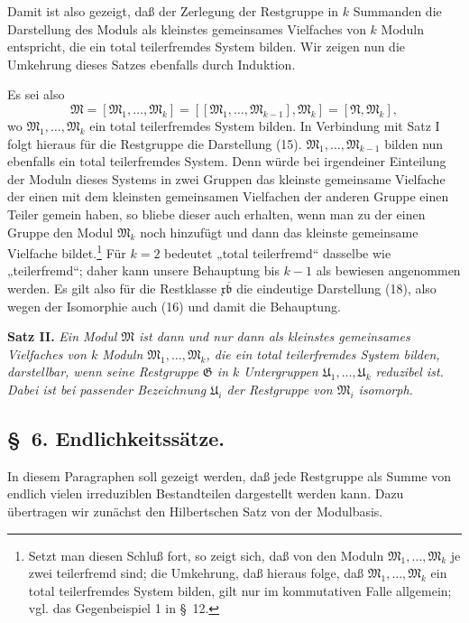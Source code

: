 \documentclass[11pt]{article}
\newcommand{\mM}{\mathfrak{M}}
\newcommand{\mN}{\mathfrak{N}}
\newcommand{\mG}{\mathfrak{G}}
\newcommand{\mb}{\mathfrak{b}}
\newcommand{\mx}{\mathfrak{x}}
\newcommand{\mU}{\mathfrak{U}}
\begin{document}
Damit ist also gezeigt, daß der Zerlegung der Restgruppe in $k$ Summanden die Darstellung des Moduls als kleinstes gemeinsames Vielfaches von $k$ Moduln entspricht, die ein total teilerfremdes System bilden. Wir zeigen nun die Umkehrung dieses Satzes ebenfalls durch Induktion.

Es sei also
\[
 \mM=[\mM_1,\ldots,\mM_k]=[[\mM_1,\ldots,\mM_{k-1}],\mM_k]=[\mN,\mM_k],
\]
wo $\mM_1,\ldots,\mM_k$ ein total teilerfremdes System bilden. In Verbindung mit Satz I folgt hieraus für die Restgruppe die Darstellung (15). $\mM_1,\ldots,\mM_{k-1}$ bilden nun ebenfalls ein total teilerfremdes System. Denn würde bei irgendeiner Einteilung der Moduln dieses Systems in zwei Gruppen das kleinste gemeinsame Vielfache der einen mit dem kleinsten gemeinsamen Vielfachen der anderen Gruppe einen Teiler gemein haben, so bliebe dieser auch erhalten, wenn man zu der einen Gruppe den Modul $\mM_k$ noch hinzufügt und dann das kleinste gemeinsame Vielfache bildet.\footnote{Setzt man diesen Schluß fort, so zeigt sich, daß von den Moduln $\mM_1,\ldots,\mM_k$ je zwei teilerfremd sind; die Umkehrung, daß hieraus folge, daß $\mM_1,\ldots,\mM_k$ ein total teilerfremdes System bilden, gilt nur im kommutativen Falle allgemein; vgl. das Gegenbeispiel 1 in \S~12.} Für $k=2$ bedeutet „total teilerfremd“ dasselbe wie „teilerfremd“; daher kann unsere Behauptung bis $k-1$ als bewiesen angenommen werden. Es gilt also für die Restklasse $\mx\overline{\mb}$ die eindeutige Darstellung (18), also wegen der Isomorphie auch (16) und damit die Behauptung.

\textbf{Satz II.} \emph{Ein Modul $\mM$ ist dann und nur dann als kleinstes gemeinsames Vielfaches von $k$ Moduln $\mM_1,\ldots,\mM_k$, die ein total teilerfremdes System bilden, darstellbar, wenn seine Restgruppe $\mG$ in $k$ Untergruppen $\mU_1,\ldots,\mU_k$ reduzibel ist. Dabei ist bei passender Bezeichnung $\mU_i$ der Restgruppe von $\mM_i$ isomorph.}

\subsection*{\S~6. Endlichkeitssätze.}

In diesem Paragraphen soll gezeigt werden, daß jede Restgruppe als Summe von endlich vielen irreduziblen Bestandteilen dargestellt werden kann. Dazu übertragen wir zunächst den Hilbertschen Satz von der Modulbasis.
\end{document}
